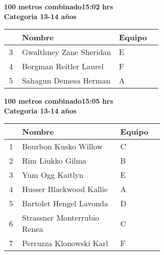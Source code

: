 \begin{minipage}{0.95\linewidth}\vspace{0.5cm} 
\begin{flushleft}
\textbf{
\hspace{-0.15cm}100 metros combinado\hspace{1.5cm}15:02 hrs \\Categoria 13-14 años}\vspace{-0.2cm} 
\end{flushleft}
\begin{tabular}{cp{0.63\linewidth}l}
\hline
& \textbf{Nombre} & \textbf{Equipo} \\ \hline
3 & Gwalthney Zane Sheridan & E \\ 
4 & Borgman Reitler Laurel & F \\ 
5 & Sahagun Demesa Herman & A \\ 
\end{tabular}
\end{minipage}
\begin{minipage}{0.95\linewidth}\vspace{0.5cm} 
\begin{flushleft}
\textbf{
\hspace{-0.15cm}100 metros combinado\hspace{1.5cm}15:05 hrs \\Categoria 13-14 años}\vspace{-0.2cm} 
\end{flushleft}
\begin{tabular}{cp{0.63\linewidth}l}
\hline
& \textbf{Nombre} & \textbf{Equipo} \\ \hline
1 & Bourbon Kusko Willow & C \\ 
2 & Rim Liukko Gilma & B \\ 
3 & Yum Ogg Kaitlyn & E \\ 
4 & Husser Blackwood Kallie & A \\ 
5 & Bartolet Hengel Lavonda & D \\ 
6 & Strassner Monterrubio Renea & C \\ 
7 & Perruzza Klonowski Karl & F \\ 
\end{tabular}
\end{minipage}
